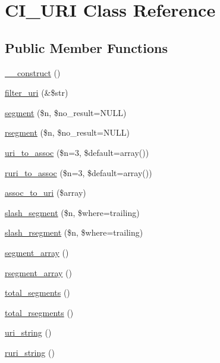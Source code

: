 \hypertarget{class_c_i___u_r_i}{}\section{C\+I\+\_\+\+U\+RI Class Reference}
\label{class_c_i___u_r_i}
\subsection*{Public Member Functions}
\begin{DoxyCompactItemize}
\item 
\mbox{\hyperlink{class_c_i___u_r_i_a1bb0e2e643b4e161e6cb621de57f2e8a}{\+\_\+\+\_\+construct}} ()
\item 
\mbox{\hyperlink{class_c_i___u_r_i_a992695f50081ab498b0c5025665d869f}{filter\+\_\+uri}} (\&\$str)
\item 
\mbox{\hyperlink{class_c_i___u_r_i_ae402f8ce148e7b6dccfb27978cbcd5a0}{segment}} (\$n, \$no\+\_\+result=N\+U\+LL)
\item 
\mbox{\hyperlink{class_c_i___u_r_i_a4422392b9c56eb253491e8744a6f0ff5}{rsegment}} (\$n, \$no\+\_\+result=N\+U\+LL)
\item 
\mbox{\hyperlink{class_c_i___u_r_i_a23e4e4bd90f415dbff459dffe3e6b075}{uri\+\_\+to\+\_\+assoc}} (\$n=3, \$default=array())
\item 
\mbox{\hyperlink{class_c_i___u_r_i_a89472567442b61897242974489e256a7}{ruri\+\_\+to\+\_\+assoc}} (\$n=3, \$default=array())
\item 
\mbox{\hyperlink{class_c_i___u_r_i_af589fb23aecbaf895302df3581d7d58d}{assoc\+\_\+to\+\_\+uri}} (\$array)
\item 
\mbox{\hyperlink{class_c_i___u_r_i_a40cf3e29370538f9b54302e928286dee}{slash\+\_\+segment}} (\$n, \$where=\textquotesingle{}trailing\textquotesingle{})
\item 
\mbox{\hyperlink{class_c_i___u_r_i_a24625e843c7f7034106a76b28d3d4cbc}{slash\+\_\+rsegment}} (\$n, \$where=\textquotesingle{}trailing\textquotesingle{})
\item 
\mbox{\hyperlink{class_c_i___u_r_i_a35dcac40dc2153eba752747fda4cd4a9}{segment\+\_\+array}} ()
\item 
\mbox{\hyperlink{class_c_i___u_r_i_ade04e22d5a0936783edb941f19fb57f0}{rsegment\+\_\+array}} ()
\item 
\mbox{\hyperlink{class_c_i___u_r_i_a1706003c4745f1f7fb723e80d2fe46b0}{total\+\_\+segments}} ()
\item 
\mbox{\hyperlink{class_c_i___u_r_i_ac7106ed5b7aa4603f04387a5393a761f}{total\+\_\+rsegments}} ()
\item 
\mbox{\hyperlink{class_c_i___u_r_i_aca6c6880ae24154bb2bb55f70eeeb1e3}{uri\+\_\+string}} ()
\item 
\mbox{\hyperlink{class_c_i___u_r_i_ad573d9faf4a3f2b733cb70d234874a1d}{ruri\+\_\+string}} ()
\end{DoxyCompactItemize}
